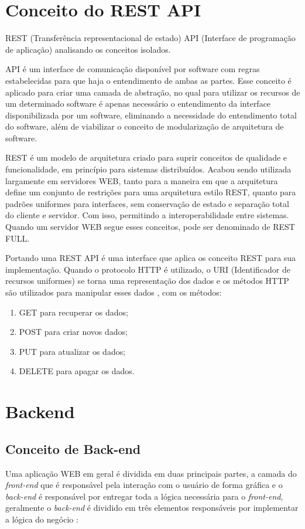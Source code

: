 \documentclass[../../layout.tex]{subfiles}
\begin{document}
\section{Conceito do REST API}
\hspace*{3em}REST (Transferência representacional de estado) API (Interface de programação de aplicação) analisando os conceitos isolados.\par
API é um interface de comunicação  disponível por software com regras estabelecidas para que haja o entendimento de ambas as partes. Esse conceito é aplicado para criar uma camada de abstração, no qual para utilizar os recursos de um determinado software é apenas necessário o entendimento da interface disponibilizada por um software, eliminando a  necessidade do entendimento total do software, além de viabilizar o conceito de modularização de arquitetura de software. \cite{16} \par 
REST é um modelo de arquitetura criado para suprir conceitos de qualidade e funcionalidade, em princípio para sistemas distribuídos. Acabou sendo utilizada largamente em servidores WEB, tanto para a maneira em que a arquitetura define um conjunto de restrições para uma arquitetura estilo REST, quanto para padrões uniformes para interfaces, sem conservação de estado e separação total do cliente e servidor. Com isso, permitindo a interoperabilidade entre sistemas. Quando um servidor WEB segue esses conceitos, pode ser denominado de REST FULL.\par
Portando uma REST API é uma interface que aplica os conceito REST para sua implementação\cite{19}. Quando o protocolo HTTP é utilizado, o URI (Identificador de recursos uniformes) se torna uma representação dos dados e os métodos HTTP são utilizados para manipular esses dados \cite{16}, com os métodos:

\begin{enumerate}[label=\alph*)]
\itemsep0em
    \item GET para recuperar os dados;
    \item POST para criar novos dados;
    \item PUT para atualizar os dados;
    \item DELETE para apagar os dados.
\end{enumerate}

\section{Backend}
\subsection{Conceito de Back-end}
\hspace*{3em}Uma aplicação WEB em geral é dividida  em duas principais partes, a camada do \emph{front-end} que é responsável pela interação com o usuário de forma gráfica e o \emph{back-end} é responsável por entregar toda a lógica necessária para o \emph{front-end}, geralmente o \emph{back-end} é dividido em três elementos responsáveis por implementar a lógica do negócio \cite{16}:
\end{document}
